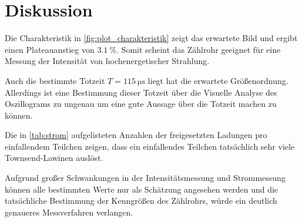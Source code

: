 \section{Diskussion}
\label{sec:Diskussion}

Die Charakteristik in \autoref{fig:plot_charakteristik} zeigt das erwartete Bild und ergibt einen Plateauanstieg von $\SI{3.1}{\percent}$.
Somit scheint das Zählrohr geeignet für eine Messung der Intensität von hochenergetischer Strahlung.

Auch die bestimmte Totzeit $T=\SI{115}{\micro\second}$ liegt hat die erwartete Größenordnung.
Allerdings ist eine Bestimmung dieser Totzeit über die Visuelle Analyse des Oszillograms zu ungenau um eine gute Aussage über die Totzeit machen zu können.

Die in \autoref{tab:strom} aufgelisteten Anzahlen der freigesetzten Ladungen pro einfallendem Teilchen zeigen, dass ein einfallendes Teilchen tatsächlich sehr viele Townsend-Lawinen auslöst.

Aufgrund großer Schwankungen in der Intensitätsmessung und Strommessung können alle bestimmten Werte nur als Schätzung angesehen werden und die tatsächliche Bestimmung der Kenngrößen des Zählrohrs, würde ein deutlich genaueres Messverfahren verlangen.